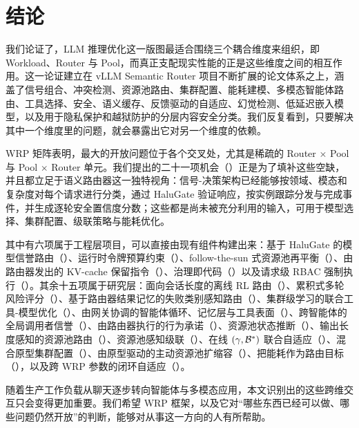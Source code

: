 \section{结论}
\label{sec:conclusion}

我们论证了，LLM 推理优化这一版图最适合围绕三个耦合维度来组织，即 Workload、Router 与 Pool，而真正支配现实性能的正是这些维度之间的相互作用。这一论证建立在 vLLM Semantic Router 项目不断扩展的论文体系之上，涵盖了信号组合、冲突检测、资源池路由、集群配置、能耗建模、多模态智能体路由、工具选择、安全、语义缓存、反馈驱动的自适应、幻觉检测、低延迟嵌入模型，以及用于隐私保护和越狱防护的分层内容安全分类。我们反复看到，只要解决其中一个维度里的问题，就会暴露出它对另一个维度的依赖。

WRP 矩阵表明，最大的开放问题位于各个交叉处，尤其是稀疏的 Router $\times$ Pool 与 Pool $\times$ Router 单元。我们提出的二十一项机会（）正是为了填补这些空缺，并且都立足于语义路由器这一独特视角：信号-决策架构已经能够按领域、模态和复杂度对每个请求进行分类，通过 HaluGate 验证响应，按实例跟踪分发与完成事件，并生成逐轮安全置信度分数；这些都是尚未被充分利用的输入，可用于模型选择、集群配置、级联策略与能耗优化。

其中有六项属于工程层项目，可以直接由现有组件构建出来：基于 HaluGate 的模型信誉路由（）、运行时令牌预算约束（）、follow-the-sun 式资源池再平衡（）、由路由器发出的 KV-cache 保留指令（）、治理即代码（）以及请求级 RBAC 强制执行（）。其余十五项属于研究层：面向会话长度的离线 RL 路由（）、累积式多轮风险评分（）、基于路由器结果记忆的失败类别感知路由（）、集群级学习的联合工具-模型优化（）、由网关协调的智能体循环、记忆层与工具表面（）、跨智能体的全局调用者信誉（）、由路由器执行的行为承诺（）、资源池状态推断（）、输出长度感知的资源池路由（）、资源池感知级联（）、在线 $(\gamma, \mathcal{B}^*)$ 联合自适应（）、混合原型集群配置（）、由原型驱动的主动资源池扩缩容（）、把能耗作为路由目标（），以及跨 WRP 参数的闭环自适应（）。

随着生产工作负载从聊天逐步转向智能体与多模态应用，本文识别出的这些跨维交互只会变得更加重要。我们希望 WRP 框架，以及它对“哪些东西已经可以做、哪些问题仍然开放”的判断，能够对从事这一方向的人有所帮助。
